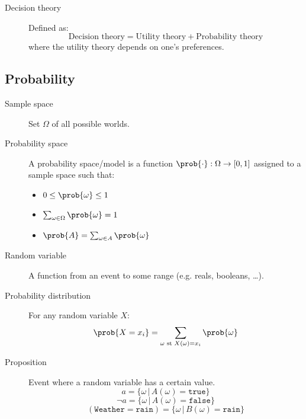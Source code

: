 \begin{description}
    \item[Decision theory] 
        Defined as:
        \[ \text{Decision theory} = \text{Utility theory} + \text{Probability theory} \]
        where the utility theory depends on one's preferences.
\end{description}


\subsection{Probability}

\begin{description}
    \item[Sample space] 
        Set $\Omega$ of all possible worlds.

    \item[Probability space] 
        A probability space/model is a function $\prob{\cdot}: \Omega \rightarrow [0, 1]$ assigned to a sample space such that:
        \begin{itemize}
            \item $0 \leq \prob{\omega} \leq 1$
            \item $\sum_{\omega \in \Omega} \prob{\omega} = 1$
            \item $\prob{A} = \sum_{\omega \in A} \prob{\omega}$
        \end{itemize}

    \item[Random variable] 
        A function from an event to some range (e.g. reals, booleans, \dots).

    \item[Probability distribution] 
        For any random variable $X$:
        \[ \prob{X = x_i} = \sum_{\omega \text{ st } X(\omega)=x_i} \prob{\omega} \]

    \item[Proposition] 
        Event where a random variable has a certain value.
        \[ a = \{ \omega \,\vert\, A(\omega) = \texttt{true} \} \]
        \[ \lnot  a = \{ \omega \,\vert\, A(\omega) = \texttt{false} \} \]
        \[ (\texttt{Weather} = \texttt{rain}) = \{ \omega \,\vert\, B(\omega) = \texttt{rain} \} \]


\end{description}
